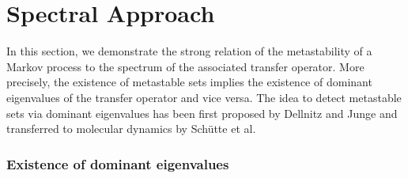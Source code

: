\section{Spectral Approach}
\label{sec:spectral}

In this section, we demonstrate the strong relation of the metastability of a Markov process to the spectrum of the associated transfer operator. %
More precisely, the existence of metastable sets implies the existence of dominant eigenvalues of the transfer operator and vice versa.
The idea to detect metastable sets via dominant eigenvalues has been first proposed by Dellnitz and Junge\cite{dellnitz1999approximation} and transferred to molecular dynamics by Sch\"utte et al\cite{schutte1998conformational,schutte1999direct}.

\subsubsection*{Existence of dominant eigenvalues}


